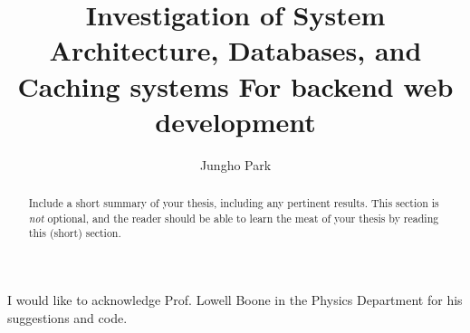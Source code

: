 \documentclass[palatino,code,picins,tikz,kaukecopyright,openright,lshortwooster,dropcaps,verbatim,index,oneside,euler]{woosterthesis}
\title{Investigation of System Architecture, Databases, and Caching systems For backend web development}
\author{Jungho Park}
\begin{document}
%
%

\frontmatter
{}

%                                                                                       
%                                                                                       

\begin{abstract}
Include a short summary of your thesis, including any pertinent results.  This section is \emph{not} optional, and the reader should be able to learn the meat of your thesis by reading this (short) section.
\end{abstract}

%                                                                                       
%                                                                                       

\dedication{This work is dedicated to the future generations of Wooster students.}


%                                                                                       
%                                                                                       

\begin{acknowl}  
I would like to acknowledge Prof. Lowell Boone in the Physics Department for his suggestions and code.
\end{acknowl}
\end{document}
